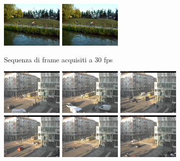 \begin{figure}
	\includegraphics[width = 3cm]{./pictures/FPSalto/img0007}
	\includegraphics[width = 3cm]{./pictures/FPSalto/img0008}
	\caption{Sequenza di frame acquisiti a 30 fps}
	\label{fig:acquisizioneContinua}
\end{figure}
\begin{figure}
	\centering
	\includegraphics[width = 3cm]{./pictures/FPSbasso/image2691}
	\includegraphics[width = 3cm]{./pictures/FPSbasso/image2692}
	\includegraphics[width = 3cm]{./pictures/FPSbasso/image2693}
	\includegraphics[width = 3cm]{./pictures/FPSbasso/image2694}
	\includegraphics[width = 3cm]{./pictures/FPSbasso/image2695}
	\includegraphics[width = 3cm]{./pictures/FPSbasso/image2696}

\end{figure}
